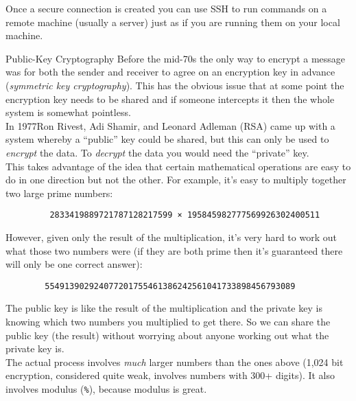 Once a secure connection is created you can use SSH to run commands on a remote machine (usually a server) just as if you are running them on your local machine.


\begin{infobox}{Public-Key Cryptography}
    Before the mid-70s the only way to encrypt a message was for both the sender and receiver to agree on an encryption key in advance (\textit{symmetric key cryptography}). This has the obvious issue that at some point the encryption key needs to be shared and if someone intercepts it then the whole system is somewhat pointless.
    \\

    In 1977\footnotemark Ron Rivest, Adi Shamir, and Leonard Adleman (RSA) came up with a system whereby a ``public'' key could be shared, but this can only be used to \textit{encrypt} the data. To \textit{decrypt} the data you would need the ``private'' key.
    \\

    This takes advantage of the idea that certain mathematical operations are easy to do in one direction but not the other. For example, it's easy to multiply together two large prime numbers:

    \begin{verbatim}
         2833419889721787128217599 × 195845982777569926302400511
    \end{verbatim}

    However, given only the result of the multiplication, it's very hard to work out what those two numbers were (if they are both prime then it's guaranteed there will only be one correct answer):

    \begin{verbatim}
        554913902924077201755461386242561041733898456793089
    \end{verbatim}

    The public key is like the result of the multiplication and the private key is knowing which two numbers you multiplied to get there. So we can share the public key (the result) without worrying about anyone working out what the private key is.
    \\

    The actual process involves \textit{much} larger numbers than the ones above (1,024 bit encryption, considered quite weak, involves numbers with 300+ digits). It also involves modulus (\texttt{\%}), because modulus is great.
\end{infobox}

